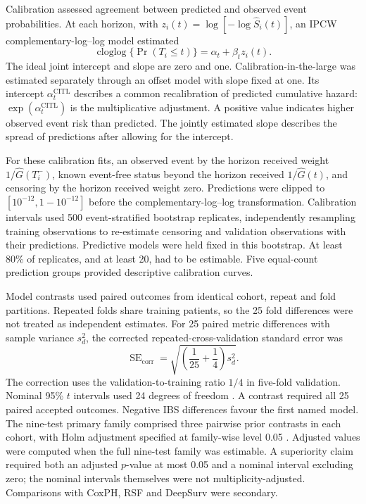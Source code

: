 Calibration assessed agreement between predicted and observed event probabilities. At each horizon, with $z_i(t)=\log[-\log\widehat S_i(t)]$, an IPCW complementary-log--log model estimated
\begin{equation}
\operatorname{cloglog}\{\Pr(T_i\leq t)\}=\alpha_t+\beta_t z_i(t).
\end{equation}
The ideal joint intercept and slope are zero and one. Calibration-in-the-large was estimated separately through an offset model with slope fixed at one. Its intercept $\alpha_t^{\mathrm{CITL}}$ describes a common recalibration of predicted cumulative hazard: $\exp(\alpha_t^{\mathrm{CITL}})$ is the multiplicative adjustment. A positive value indicates higher observed event risk than predicted. The jointly estimated slope describes the spread of predictions after allowing for the intercept.

For these calibration fits, an observed event by the horizon received weight $1/\widehat G(T_i^-)$, known event-free status beyond the horizon received $1/\widehat G(t)$, and censoring by the horizon received weight zero. Predictions were clipped to $[10^{-12},1-10^{-12}]$ before the complementary-log--log transformation. Calibration intervals used 500 event-stratified bootstrap replicates, independently resampling training observations to re-estimate censoring and validation observations with their predictions. Predictive models were held fixed in this bootstrap. At least 80\% of replicates, and at least 20, had to be estimable. Five equal-count prediction groups provided descriptive calibration curves.

Model contrasts used paired outcomes from identical cohort, repeat and fold partitions. Repeated folds share training patients, so the 25 fold differences were not treated as independent estimates. For 25 paired metric differences with sample variance $s_d^2$, the corrected repeated-cross-validation standard error was
\begin{equation}
\operatorname{SE}_{\mathrm{corr}}=\sqrt{\left(\frac{1}{25}+\frac{1}{4}\right)s_d^2}.
\end{equation}
The correction uses the validation-to-training ratio $1/4$ in five-fold validation. Nominal 95\% $t$ intervals used 24 degrees of freedom \cite{nadeau2003}. A contrast required all 25 paired accepted outcomes. Negative IBS differences favour the first named model. The nine-test primary family comprised three pairwise prior contrasts in each cohort, with Holm adjustment specified at family-wise level 0.05 \cite{holm1979}. Adjusted values were computed when the full nine-test family was estimable. A superiority claim required both an adjusted $p$-value at most 0.05 and a nominal interval excluding zero; the nominal intervals themselves were not multiplicity-adjusted. Comparisons with CoxPH, RSF and DeepSurv were secondary.

